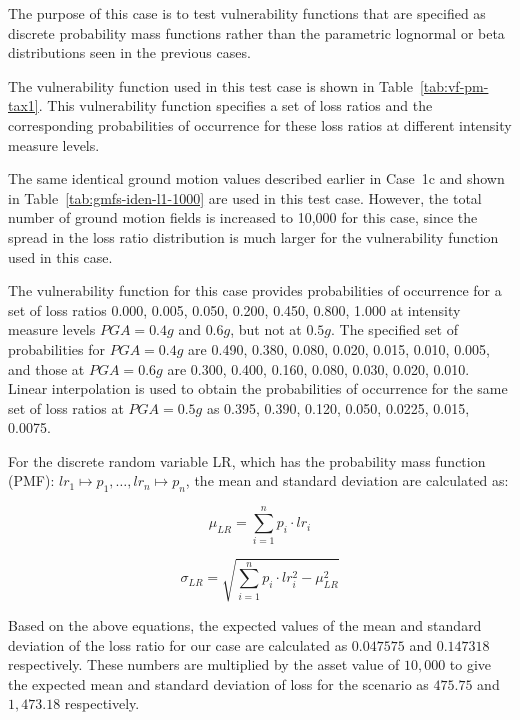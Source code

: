 The purpose of this case is to test vulnerability functions that are specified as discrete probability mass functions rather than the parametric lognormal or beta distributions seen in the previous cases.



The vulnerability function used in this test case is shown in Table~\ref{tab:vf-pm-tax1}. This vulnerability function specifies a set of loss ratios and the corresponding probabilities of occurrence for these loss ratios at different intensity measure levels.

The same identical ground motion values described earlier in Case~1c and shown in Table~\ref{tab:gmfs-iden-l1-1000} are used in this test case. However, the total number of ground motion fields is increased to 10,000 for this case, since the spread in the loss ratio distribution is much larger for the vulnerability function used in this case.

The vulnerability function for this case provides probabilities of occurrence for a set of loss ratios {0.000, 0.005, 0.050, 0.200, 0.450, 0.800, 1.000} at intensity measure levels $PGA = 0.4 g$ and $0.6 g$, but not at $0.5 g$. The specified set of probabilities for $PGA = 0.4 g$ are {0.490, 0.380, 0.080, 0.020, 0.015, 0.010, 0.005}, and those at $PGA = 0.6 g$ are {0.300, 0.400, 0.160, 0.080, 0.030, 0.020, 0.010}. Linear interpolation is used to obtain the probabilities of occurrence for the same set of loss ratios at $PGA = 0.5 g$ as {0.395, 0.390, 0.120, 0.050, 0.0225, 0.015, 0.0075}.

For the discrete random variable LR, which has the probability mass function (PMF): $lr_1 \mapsto p_1, \dotsc, lr_n \mapsto p_n$, the mean and standard deviation are calculated as:

\begin{equation}
\mu_{LR} = \sum_{i=1}^{n} p_i \cdot lr_i
\end{equation}

\begin{equation}
\sigma_{LR} = \sqrt{\sum_{i=1}^{n} p_i \cdot lr_i^2 - \mu_{LR}^2}
\end{equation}

Based on the above equations, the expected values of the mean and standard deviation of the loss ratio for our case are calculated as $0.047575$ and $0.147318$ respectively. These numbers are multiplied by the asset value of $10,000$ to give the expected mean and standard deviation of loss for the scenario as $475.75$ and $1,473.18$ respectively.